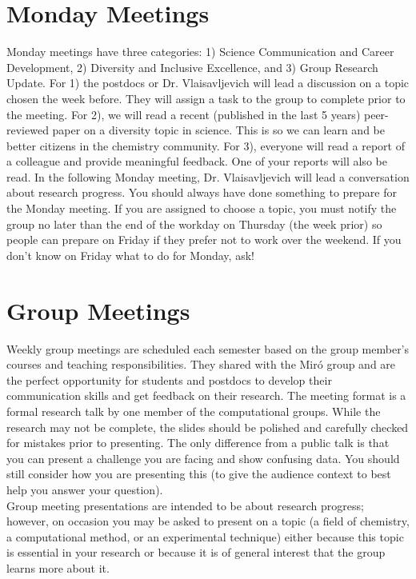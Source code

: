 \documentclass[letterpaper]{article}
\begin{document}
\section*{Monday Meetings}
Monday meetings have three categories: 1) Science Communication and Career Development, 2) Diversity and Inclusive Excellence, and 3) Group Research Update. For 1) the postdocs or Dr. Vlaisavljevich will lead a discussion on a topic chosen the week before. They will assign a task to the group to complete prior to the meeting. For 2), we will read a recent (published in the last 5 years) peer-reviewed paper on a diversity topic in science. This is so we can learn and be better citizens in the chemistry community. For 3), everyone will read a report of a colleague and provide meaningful feedback. One of your reports will also be read. In the following Monday meeting, Dr. Vlaisavljevich will lead a conversation about research progress. You should always have done something to prepare for the Monday meeting. If you are assigned to choose a topic, you must notify the group no later than the end of the workday on Thursday (the week prior) so people can prepare on Friday if they prefer not to work over the weekend. If you don't know on Friday what to do for Monday, ask! 

\section*{Group Meetings}
Weekly group meetings are scheduled each semester based on the group member's courses and teaching responsibilities. They shared with the Mir\'o group and are the perfect opportunity for students and postdocs to develop their communication skills and get feedback on their research. The meeting format is a formal research talk by one member of the computational groups. While the research may not be complete, the slides should be polished and carefully checked for mistakes prior to presenting. The only difference from a public talk is that you can present a challenge you are facing and show confusing data. You should still consider how you are presenting this (to give the audience context to best help you answer your question). \\

Group meeting presentations are intended to be about research progress; however, on occasion you may be asked to present on a topic (a field of chemistry, a computational method, or an experimental technique) either because this topic is essential in your research or because it is of general interest that the group learns more about it. \\
\end{document}
